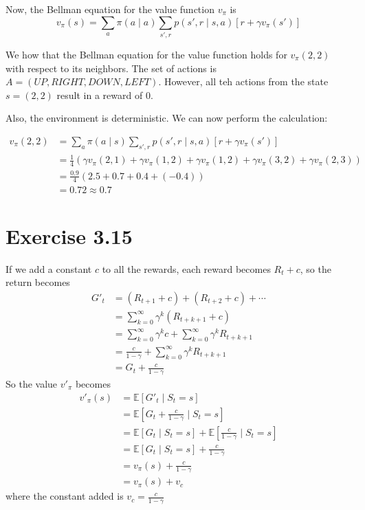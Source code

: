 \documentclass[a4paper,11pt,reqno]{amsart}
\begin{document}
Now, the Bellman equation for the value function $v _{\pi }$ is
\[
    v _{\pi }(s) = \sum_{a} \pi (a \mid a) \sum_{s', r} p(s', r \mid s, a) \left[ r + \gamma v _{\pi }(s') \right] 
\]

We how that the Bellman equation for the value function holds for $v _{\pi }(2, 2)$ with respect to its neighbors. The set of actions is $A=(UP,  RIGHT, DOWN, LEFT)$. However, all teh actions from the state $s=(2, 2)$ result in a reward of $0$. 

Also, the environment is deterministic. We can now perform the calculation:

\begin{align}
    v _{\pi }(2, 2) &= \sum_{a} \pi(a \mid  s) \sum_{s', r} p(s', r \mid s, a) \left[ r + \gamma  v _{\pi }(s') \right] \\
    &= \frac{1}{4}(\gamma v _{\pi }(2, 1) + \gamma v _{\pi }(1, 2) + \gamma v _{\pi }(1, 2) + \gamma v _{\pi }(3, 2) + \gamma  v _{\pi } (2, 3))\\
    &= \frac{0.9}{4}(2.5 + 0.7 + 0.4 + (-0.4))\\
    &= 0.72 \approx 0.7
\end{align}

\section*{Exercise 3.15}
If we add a constant $c$ to all the rewards, each reward becomes $R_t + c$, so the return becomes
\begin{align}
    G'_t &= (R_{t + 1} + c) + (R_{t + 2} + c) + \cdots \\
        &= \sum_{k=0}^{\infty} \gamma ^{k}(R_{t + k + 1}  + c) \\
        &= \sum_{k=0}^{\infty} \gamma ^{k}c + \sum_{k=0}^{\infty} \gamma ^{k}R_{t + k + 1} \\
        &= \frac{c}{1 - \gamma} + \sum_{k=0}^{\infty} \gamma ^{k}R_{t + k + 1}   \\
        &= G_{t} + \frac{c}{1 - \gamma } 
\end{align}
So the value $v'_\pi $ becomes 
\begin{align}
    v'_\pi (s) &= \mathbb{E}\left[ G'_t  \mid S_t = s \right] \\
&= \mathbb{E}\left[ G_t + \frac{c}{1 - \gamma } \mid S_t =s \right]  \\
&= \mathbb{E}\left[ G_t \mid S_t = s \right] + \mathbb{E}\left[ \frac{c}{1 - \gamma } \mid S_t = s \right]   \\
&= \mathbb{E}\left[ G_t \mid S_t = s \right] + \frac{c}{1 - \gamma }\\
&= v_{\pi }(s) + \frac{c}{1 - \gamma } \\
&= v_{\pi }(s) + v_c 
\end{align}
where the constant added is $v_c =\frac{c}{ 1-  \gamma }$
\end{document}
